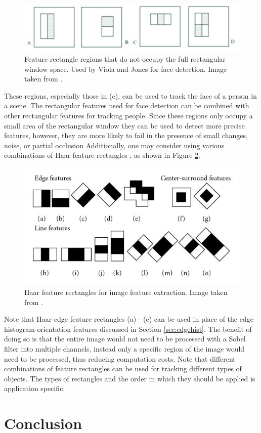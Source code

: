 \documentclass[11pt]{article}
\begin{document}
\begin{figure}[H]
\centering
\includegraphics[scale=.4]{img/partialregions.jpg}
\caption{Feature rectangle regions that do not occupy the full rectangular window space. Used by Viola and Jones for face detection. Image taken from \cite{facedetection}.}
\label{fig:partialregions}
\end{figure}

These regions, especially those in (c), can be used to track the face of a person in a scene. The rectangular features used for face detection can be combined with other rectangular features for tracking people. Since these regions only occupy a small area of the rectangular window they can be used to detect more precise features, however, they are more likely to fail in the presence of small changes, noise, or partial occlusion Additionally, one may consider using various combinations of Haar feature rectangles \cite{haar} \cite{haar2}, as shown in Figure \ref{fig:haarrectangles}.

\begin{figure}[H]
\centering
\includegraphics[scale=2]{img/haarrectangles.jpg}
\caption{Haar feature rectangles for image feature extraction. Image taken from \cite{haarpic}.}
\label{fig:haarrectangles}
\end{figure}

Note that Haar edge feature rectangles (a) - (e) can be used in place of the edge histogram orientation features discussed in Section \ref{sec:edgehist}. The benefit of doing so is that the entire image would not need to be processed with a Sobel filter into multiple channels, instead only a specific region of the image would need to be processed, thus reducing computation costs. Note that different combinations of feature rectangles can be used for tracking different types of objects. The types of rectangles and the order in which they should be applied is application specific.   


\section{Conclusion}
\label{sec:conclusion}





\newpage
\footnotesize


\end{document}
